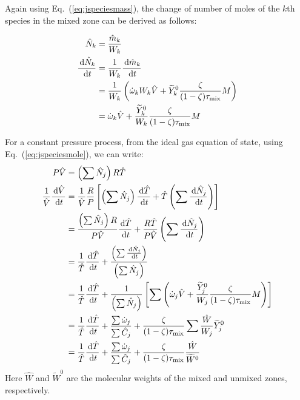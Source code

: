 Again using Eq.~(\ref{eq:jspeciesmass}), the change of number of moles of the $k$th species in the mixed zone can be derived as follows:

\begin{align} \label{eq:jspeciesmole}
    \hat{N}_{k} &= \frac{\hat{m}_{k}}{W_k} \\
    \frac{\,\mathrm{d} {\hat{N}_{k}}}{\,\mathrm{d} t} &= \frac{1}{W_k} \frac{\,\mathrm{d} {\hat{m}_{k}}}{\,\mathrm{d} t} \\
    &= \frac{1}{W_k} \left( \dot{\omega}_k W_k \hat{V} + \widetilde{Y}_k^0 \frac{\zeta}{(1-\zeta)\tau_{\rm mix}} M \right)    \\
    &=\dot{\omega}_k \hat{V} + \frac{\widetilde{Y}_k^0}{W_k} \frac{\zeta}{(1-\zeta)\tau_{\rm mix}} M
\end{align}


For a constant pressure process, from the ideal gas equation of state, using Eq.~(\ref{eq:jspeciesmole}), we can write:
\begin{align} \label{eq:volumeterm}
     P\hat{V} &= \left(\sum{\hat{N}_j}\right) R \hat{T} \\
     \frac{1}{\hat{V}}\frac{\,\mathrm{d} {\hat{V}}}{\,\mathrm{d} t} & = \frac{1}{\hat{V}} \frac{R}{P} \left[ \left(\sum{\hat{N}_j}\right) \frac{\,\mathrm{d} \hat{T}}{\,\mathrm{d} t} + \hat{T} \left(\sum{\frac{\,\mathrm{d}\hat{N}_j}{\,\mathrm{d}t}}\right) \right] \\
     &= \frac{\left(\sum{\hat{N}_j}\right) R}{P \hat{V}} \frac{\,\mathrm{d} \hat{T}}{\,\mathrm{d} t} + \frac{R \hat{T}}{P \hat{V}} \left(\sum{\frac{\,\mathrm{d}\hat{N}_j}{\,\mathrm{d}t}}\right) \\
     &=\frac{1}{\hat{T}} \frac{\,\mathrm{d} \hat{T}}{\,\mathrm{d} t} + \frac{\left(\sum{\frac{\,\mathrm{d}\hat{N}_j}{\,\mathrm{d}t}}\right)}{\left(\sum{\hat{N}_j}\right)} \\
     & = \frac{1}{\hat{T}} \frac{\,\mathrm{d} \hat{T}}{\,\mathrm{d} t} + \frac{1}{\left(\sum{\hat{N}_j}\right)} \left[ \sum{\left(\dot{\omega}_j \hat{V} + \frac{\widetilde{Y}_j^0}{W_j} \frac{\zeta}{(1-\zeta)\tau_{\rm mix}} M \right) }\right]  \\
     &= \frac{1}{\hat{T}} \frac{\,\mathrm{d} \hat{T}}{\,\mathrm{d} t} + \frac{\sum{\dot{\omega}_j}}{\sum{\hat{C}_j}}+\frac{\zeta}{(1-\zeta)\tau_{\rm mix}}\sum{\frac{\hat{W}}{W_j} \widetilde{Y}_j^0} \\
     &= \frac{1}{\hat{T}} \frac{\,\mathrm{d} \hat{T}}{\,\mathrm{d} t} + \frac{\sum{\dot{\omega}_j}}{\sum{\hat{C}_j}}+\frac{\zeta}{(1-\zeta)\tau_{\rm mix}}\frac{\hat{W}}{\widetilde{W}^0}
\end{align}
Here $\hat{W}$ and $\widetilde{W}^0$ are the molecular weights of the mixed and unmixed zones, respectively.

